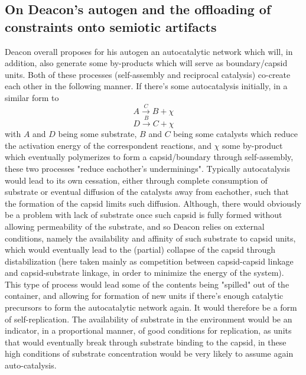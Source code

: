 \documentclass[a4paper,12pt,twoside,leqno]{article}
\begin{document}
\subsection*{On Deacon's autogen and the offloading of constraints onto semiotic artifacts}
Deacon overall proposes for his autogen an autocatalytic network which will, in addition, also generate some by-products which will serve as boundary/capsid units. Both of these processes (self-assembly and reciprocal catalysis) co-create each other in the following manner. If there's some autocatalysis initially, in a similar form to
$$
A \xrightarrow{C} B + \chi
$$
$$
D \xrightarrow{B} C + \chi
$$
with $A$ and $D$ being some substrate, $B$ and $C$ being some catalysts which reduce the activation energy of the correspondent reactions, and $\chi$ some by-product which eventually polymerizes to form a capsid/boundary through self-assembly, these two processes "reduce eachother's underminings". Typically autocatalysis would lead to its own cessation, either through complete consumption of substrate or eventual diffusion of the catalysts away from eachother, such that the formation of the capsid limits such diffusion. Although, there would obviously be a problem with lack of substrate once such capsid is fully formed without allowing permeability of the substrate, and so Deacon relies on external conditions, namely the availability and affinity of such substrate to capsid units, which would eventually lead to the (partial) collapse of the capsid through distabilization (here taken mainly as competition between capsid-capsid linkage and capsid-substrate linkage, in order to minimize the energy of the system). This type of process would lead some of the contents being "spilled" out of the container, and allowing for formation of new units if there's enough catalytic precursors to form the autocatalytic network again. It would therefore be a form of self-replication. The availability of substrate in the environment would be an indicator, in a proportional manner, of good conditions for replication, as units that would eventually break through substrate binding to the capsid, in these high conditions of substrate concentration would be very likely to assume again auto-catalysis.\\
\end{document}
